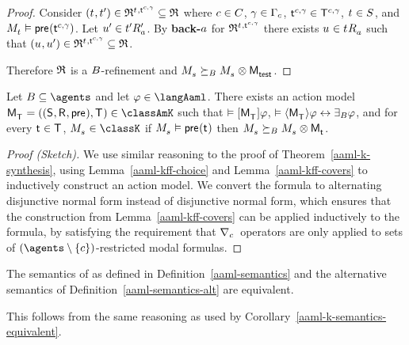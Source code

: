 \begin{proof}
Consider $(\kStateT, \kStateTP) \in \refinement^{\kStateT, \aStateT[\agentC, \gamma]} \subseteq \refinement$ where $\agentC \in \agentsC$, $\gamma \in \Gamma_\agentC$, $\aStateT[\agentC, \gamma] \in \aStatesT[\agentC, \gamma]$, $\kStateT \in \kStates$, and $\kPModel{\kStateT} \entails \aPrecondition(\aStateT[\agentC, \gamma])$.
Let $\kStateUP \in \kSuccessorsPA{\kStateTP}$.
By {\bf back-$\agentA$} for $\refinement^{\kStateT, \aStateT[\agentC, \gamma]}$ there exists $\kStateU \in \kSuccessorsA{\kStateT}$ such that $(\kStateU, \kStateUP) \in \refinement^{\kStateT, \aStateT[\agentC, \gamma]} \subseteq \refinement$.

Therefore $\refinement$ is a $\agentsB$-refinement and $\kPModel{\kStateS} \simulatesBs \kPModel{\kStateS} \exec \aPModel{\aStateTest}$.
\end{proof}

\begin{theorem}\label{aaml-kff-synthesis}
Let $\agentsB \subseteq \agents$ and let $\phi \in \langAaml$.
There exists an action model $\aPModelAndTuple{\aStatesT} \in \classAmK$ such that 
$\entails \actionA{\aPModel{\aStatesT}} \phi$,
$\entails \actionE{\aPModel{\aStatesT}} \phi \iff \someactsBs \phi$, and
for every $\aStateT \in \aStatesT$, $\kPModel{\kStateS} \in \classK$ if $\kPModel{\kStateS} \entails \aPrecondition(\aStateT)$ then $\kPModel{\kStateS} \simulatesBs \kPModel{\kStateS} \exec \aPModel{\aStateT}$.
\end{theorem}

\begin{proof}[Proof (Sketch)]
We use similar reasoning to the proof of Theorem~\ref{aaml-k-synthesis}, using Lemma~\ref{aaml-kff-choice} and Lemma~\ref{aaml-kff-covers} to inductively construct an action model.
We convert the formula to alternating disjunctive normal form instead of disjunctive normal form, which ensures that the construction from Lemma~\ref{aaml-kff-covers} can be applied inductively to the formula, by satisfying the requirement that $\coversC$~operators are only applied to sets of $(\agents \setminus \{\agentC\})$-restricted modal formulas.
\end{proof}

\begin{corollary}\label{aaml-kff-semantics-equivalent}
The semantics of \logicAamlKFF{} as defined in Definition~\ref{aaml-semantics} and the alternative semantics of Definition~\ref{aaml-semantics-alt} are equivalent.
\end{corollary}

This follows from the same reasoning as used by Corollary~\ref{aaml-k-semantics-equivalent}.
